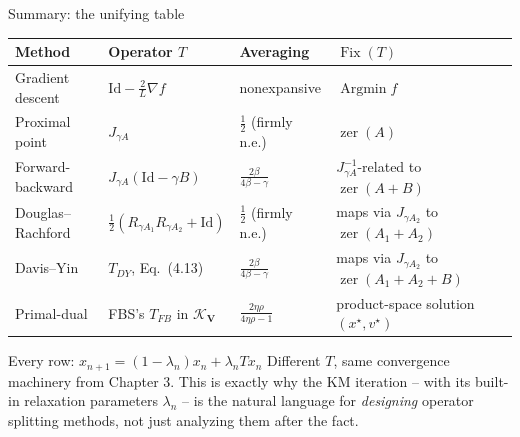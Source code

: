 \documentclass[aspectratio=169,10pt]{beamer}
\newcommand{\Id}{\mathrm{Id}}
\newcommand{\Fix}{\operatorname{Fix}}
\newcommand{\zer}{\operatorname{zer}}
\newcommand{\bv}[1]{\mathbf{#1}}
\begin{document}
\begin{frame}{Summary: the unifying table}
  \centering\footnotesize
  \begin{tabular}{p{2.6cm} p{4.6cm} p{2.3cm} p{2.7cm}}
    \toprule
    \textbf{Method} & \textbf{Operator $T$} & \textbf{Averaging} & \textbf{$\Fix(T)$} \\
    \midrule
    Gradient descent & $\Id-\tfrac2L\nabla f$ & nonexpansive & $\operatorname*{Argmin} f$ \\
    Proximal point & $J_{\gamma A}$ & $\tfrac12$ (firmly n.e.) & $\zer(A)$ \\
    Forward-backward & $J_{\gamma A}(\Id-\gamma B)$ & $\tfrac{2\beta}{4\beta-\gamma}$ & $J_{\gamma A}^{-1}$-related to $\zer(A+B)$ \\
    Douglas--Rachford & $\tfrac12(R_{\gamma A_1}R_{\gamma A_2}+\Id)$ & $\tfrac12$ (firmly n.e.) & maps via $J_{\gamma A_2}$ to $\zer(A_1+A_2)$ \\
    Davis--Yin & $T_{DY}$, Eq.\ (4.13) & $\tfrac{2\beta}{4\beta-\gamma}$ & maps via $J_{\gamma A_2}$ to $\zer(A_1+A_2+B)$ \\
    Primal-dual & FBS's $T_{FB}$ in $\mathcal K_{\bv V}$ & $\tfrac{2\eta\rho}{4\eta\rho-1}$ & product-space solution $(x^\star,v^\star)$ \\
    \bottomrule
  \end{tabular}
  \vspace{0.4cm}
  \begin{block}{Every row: $x_{n+1}=(1-\lambda_n)x_n+\lambda_n Tx_n$}
    Different $T$, same convergence machinery from Chapter 3. This is exactly why the KM iteration -- with its built-in relaxation parameters $\lambda_n$ -- is the natural language for \emph{designing} operator splitting methods, not just analyzing them after the fact.
  \end{block}
\end{frame}
\end{document}
